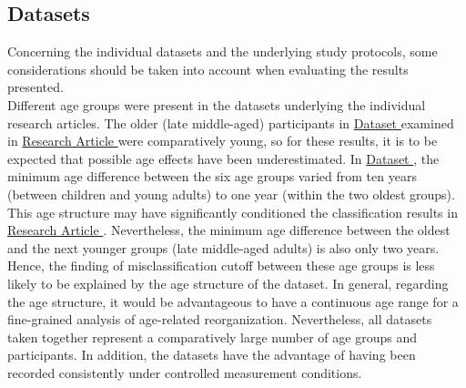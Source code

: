 \subsection{Datasets}
Concerning the individual datasets and the underlying study protocols, some considerations should be taken into account when evaluating the results presented.\\
Different age groups were present in the datasets underlying the individual research articles. The older (late middle-aged) participants in \hyperref[methods:datasets:I]{Dataset } examined in \hyperref[results:paperI]{Research Article } were comparatively young, so for these results, it is to be expected that possible age effects have been underestimated. In \hyperref[methods:datasets:II]{Dataset }, the minimum age difference between the six age groups varied from ten years (between children and young adults) to one year (within the two oldest groups). This age structure may have significantly conditioned the classification results in \hyperref[results:paperII]{Research Article }. Nevertheless, the minimum age difference between the oldest and the next younger groups (late middle-aged adults) is also only two years. Hence, the finding of misclassification cutoff between these age groups is less likely to be explained by the age structure of the dataset. In general, regarding the age structure, it would be advantageous to have a continuous age range for a fine-grained analysis of age-related reorganization. Nevertheless, all datasets taken together represent a comparatively large number of age groups and participants. In addition, the datasets have the advantage of having been recorded consistently under controlled measurement conditions.\\
